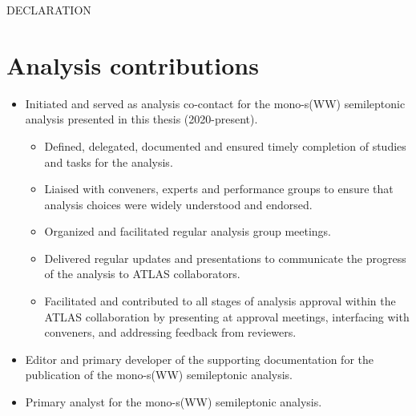 \begin{center}
DECLARATION
\end{center}

\section*{Analysis contributions}

\begin{itemize}
\item Initiated and served as analysis co-contact for the mono-s(WW) semileptonic analysis presented in this thesis (2020-present).
\begin{small}
\begin{itemize}
\item Defined, delegated, documented and ensured timely completion of studies and tasks for the analysis.
\item Liaised with conveners, experts and performance groups to ensure that analysis choices were widely understood and endorsed.
\item Organized and facilitated regular analysis group meetings.
\item Delivered regular updates and presentations to communicate the progress of the analysis to ATLAS collaborators. 
\item Facilitated and contributed to all stages of analysis approval within the ATLAS collaboration by presenting at approval meetings, interfacing with conveners, and addressing feedback from reviewers.
\end{itemize}
\end{small}
\item Editor and primary developer of the supporting documentation for the publication of the mono-s(WW) semileptonic analysis.
\item Primary analyst for the mono-s(WW) semileptonic analysis.
\begin{itemize}
\end{itemize}
\end{itemize}
